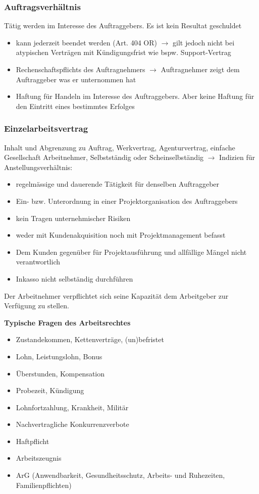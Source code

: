 \documentclass{report}
\theoremstyle{definition}
\theoremstyle{example}
\begin{document}
\subsubsection{Auftragsverhältnis}
Tätig werden im Interesse des Auftraggebers. Es ist kein Resultat geschuldet
\begin{itemize}
   \item kann jederzeit beendet werden (Art. 404 OR) $\rightarrow$ gilt jedoch nicht bei atypischen Verträgen mit Kündigungsfrist wie bspw. Support-Vertrag
   \item Rechenschaftspflichts des Auftragnehmers $\rightarrow$ Auftragnehmer zeigt dem Auftraggeber was er unternommen hat
   \item Haftung für Handeln im Interesse des Auftraggebers. Aber keine Haftung für den Eintritt eines bestimmtes Erfolges
\end{itemize}

\subsubsection{Einzelarbeitsvertrag}
Inhalt und Abgrenzung zu Auftrag, Werkvertrag, Agenturvertrag, einfache Gesellschaft
Arbeitnehmer, Selbstständig oder Scheinselbständig $\rightarrow$ Indizien für Anstellungsverhältnis:
\begin{itemize}
   \item regelmässige und dauerende Tätigkeit für denselben Auftraggeber
   \item Ein- bzw. Unterordnung in einer Projektorganisation des Auftraggebers
   \item kein Tragen unternehmischer Risiken
   \item weder mit Kundenakquisition noch mit Projektmanagement befasst
   \item Dem Kunden gegenüber für Projektausführung und allfällige Mängel nicht verantwortlich
   \item Inkasso nicht selbständig durchführen
\end{itemize}
Der Arbeitnehmer verpflichtet sich seine Kapazität dem Arbeitgeber zur Verfügung zu stellen.

\textbf{Typische Fragen des Arbeitsrechtes}
\begin{itemize}
   \item Zustandekommen, Kettenverträge, (un)befristet 
   \item Lohn, Leistungslohn, Bonus
   \item Überstunden, Kompensation
   \item Probezeit, Kündigung
   \item Lohnfortzahlung, Krankheit, Militär
   \item Nachvertragliche Konkurrenzverbote
   \item Haftpflicht
   \item Arbeitszeugnis
   \item ArG (Anwendbarkeit, Gesundheitsschutz, Arbeits- und Ruhezeiten, Familienpflichten)
\end{itemize}
\end{document}
